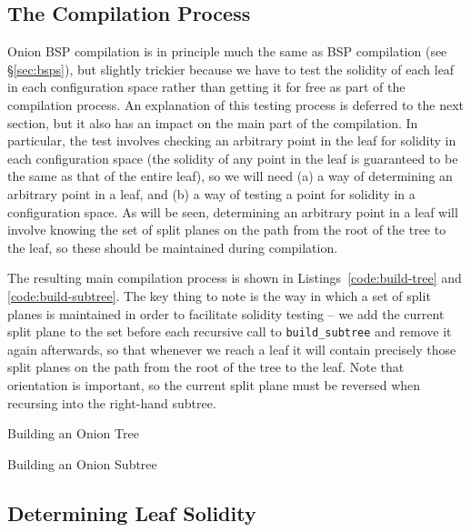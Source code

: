 \documentclass[10pt,twocolumn]{article}
\begin{document}
\subsection{The Compilation Process}

Onion BSP compilation is in principle much the same as BSP compilation (see \S\ref{sec:bsps}), but slightly trickier because we have to test the solidity of each leaf in each configuration space rather than getting it for free as part of the compilation process. An explanation of this testing process is deferred to the next section, but it also has an impact on the main part of the compilation. In particular, the test involves checking an arbitrary point in the leaf for solidity in each configuration space (the solidity of any point in the leaf is guaranteed to be the same as that of the entire leaf), so we will need (a) a way of determining an arbitrary point in a leaf, and (b) a way of testing a point for solidity in a configuration space. As will be seen, determining an arbitrary point in a leaf will involve knowing the set of split planes on the path from the root of the tree to the leaf, so these should be maintained during compilation.

The resulting main compilation process is shown in Listings~\ref{code:build-tree} and \ref{code:build-subtree}. The key thing to note is the way in which a set of split planes is maintained in order to facilitate solidity testing -- we add the current split plane to the set before each recursive call to \texttt{build\_subtree} and remove it again afterwards, so that whenever we reach a leaf it will contain precisely those split planes on the path from the root of the tree to the leaf. Note that orientation is important, so the current split plane must be reversed when recursing into the right-hand subtree.

\begin{stulisting}[!t]
\caption{Building an Onion Tree}
\label{code:build-tree}

\end{stulisting}

\begin{stulisting}[!t]
\caption{Building an Onion Subtree}
\label{code:build-subtree}

\end{stulisting}

\subsection{Determining Leaf Solidity}
\end{document}
